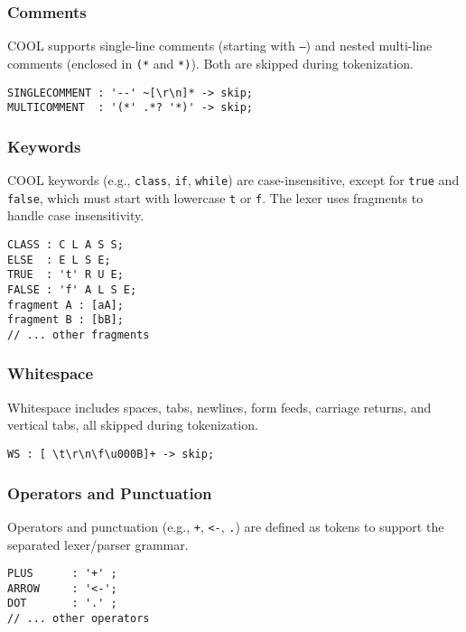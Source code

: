 \documentclass[titlepage]{article}
\begin{document}
\subsubsection{Comments}

COOL supports single-line comments (starting with \texttt{--}) and nested multi-line comments (enclosed in \texttt{(*} and \texttt{*)}). Both are skipped during tokenization.

\begin{lstlisting}
SINGLECOMMENT : '--' ~[\r\n]* -> skip;
MULTICOMMENT  : '(*' .*? '*)' -> skip;
\end{lstlisting}

\subsubsection{Keywords}

COOL keywords (e.g., \texttt{class}, \texttt{if}, \texttt{while}) are case-insensitive, except for \texttt{true} and \texttt{false}, which must start with lowercase \texttt{t} or \texttt{f}. The lexer uses fragments to handle case insensitivity.

\begin{lstlisting}
CLASS : C L A S S;
ELSE  : E L S E;
TRUE  : 't' R U E;
FALSE : 'f' A L S E;
fragment A : [aA];
fragment B : [bB];
// ... other fragments
\end{lstlisting}

\subsubsection{Whitespace}

Whitespace includes spaces, tabs, newlines, form feeds, carriage returns, and vertical tabs, all skipped during tokenization.

\begin{lstlisting}
WS : [ \t\r\n\f\u000B]+ -> skip;
\end{lstlisting}

\subsubsection{Operators and Punctuation}

Operators and punctuation (e.g., \texttt{+}, \texttt{<-}, \texttt{.}) are defined as tokens to support the separated lexer/parser grammar.

\begin{lstlisting}
PLUS      : '+' ;
ARROW     : '<-';
DOT       : '.' ;
// ... other operators
\end{lstlisting}
\end{document}
